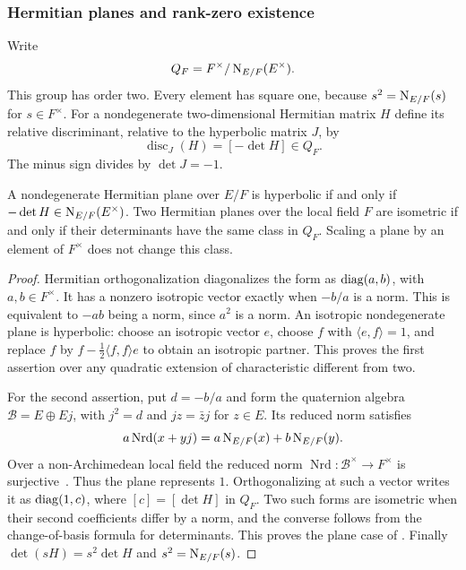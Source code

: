 \subsubsection{Hermitian planes and rank-zero existence}

Write
\[
 Q_F=F^\times/\operatorname{N}_{E/F}(E^\times).
\]
This group has order two.  Every element has square one, because
$s^2=\operatorname{N}_{E/F}(s)$ for $s\in F^\times$.  For a nondegenerate
two-dimensional Hermitian matrix $H$ define its relative
discriminant, relative to the hyperbolic matrix $J$, by
\begin{equation}\label{m2:rat:discriminant}
 \operatorname{disc}_J(H)=[-\det H]\in Q_F.
\end{equation}
The minus sign divides by $\det J=-1$.

\begin{lemma}\label{m2:rat:hermitian-planes}
A nondegenerate Hermitian plane over $E/F$ is hyperbolic if and
only if $-\det H\in\operatorname{N}_{E/F}(E^\times)$.  Two Hermitian planes
over the local field $F$ are isometric if and only if their
determinants have the same class in $Q_F$.  Scaling a plane by
an element of $F^\times$ does not change this class.
\end{lemma}

\begin{proof}
Hermitian orthogonalization diagonalizes the form as
$\operatorname{diag}(a,b)$, with $a,b\in F^\times$.  It has a nonzero
isotropic vector exactly when $-b/a$ is a norm.  This is
equivalent to $-ab$ being a norm, since $a^2$ is a norm.
An isotropic nondegenerate plane is hyperbolic: choose an
isotropic vector $e$, choose $f$ with $\langle e,f\rangle=1$,
and replace $f$ by
$f-\frac12\langle f,f\rangle e$ to obtain an isotropic
partner. This proves the first assertion over any quadratic
extension of characteristic different from two.

For the second assertion, put $d=-b/a$ and form the quaternion
algebra $\mathscr B=E\oplus Ej$, with $j^2=d$ and
$jz=\bar z j$ for $z\in E$. Its reduced norm satisfies
\[
 a\operatorname{Nrd}(x+yj)
 =a\operatorname{N}_{E/F}(x)+b\operatorname{N}_{E/F}(y).
\]
Over a non-Archimedean local field the reduced norm
$\operatorname{Nrd}:\mathscr B^\times\to F^\times$ is
surjective~\cite[Lemma~13.4.9]{Voight21}. Thus the plane represents $1$.
Orthogonalizing at such a vector writes it as $\operatorname{diag}(1,c)$,
where $[c]=[\det H]$ in $Q_F$. Two such forms are isometric
when their second coefficients differ by a norm, and the
converse follows from the change-of-basis formula for
determinants. This proves the plane case of
\cite[Theorem~3.1]{Jacobowitz62}. Finally
$\det(sH)=s^2\det H$ and $s^2=\operatorname{N}_{E/F}(s)$.
\end{proof}

